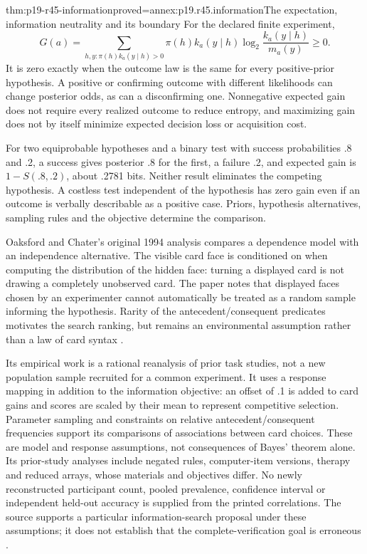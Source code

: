 \begin{hbtheorem}{thm:p19-r45-information}{proved=annex:p19.r45.information}{The expectation, information neutrality and its boundary}
For the declared finite experiment,
\[
 G(a)=\sum_{h,y:\pi(h)k_a(y\mid h)>0}
 \pi(h)k_a(y\mid h)\log_2
 \frac{k_a(y\mid h)}{m_a(y)}\geq0.
\]
It is zero exactly when the outcome law is the same for every
positive-prior hypothesis. A positive or confirming outcome with
different likelihoods can change posterior odds, as can a disconfirming
one. Nonnegative expected gain does not require every realized outcome
to reduce entropy, and maximizing gain does not by itself minimize
expected decision loss or acquisition cost.
\end{hbtheorem}

For two equiprobable hypotheses and a binary test with success
probabilities .8 and .2, a success gives posterior .8 for the first,
a failure .2, and expected gain is \(1-S(.8,.2)\), about .2781 bits.
Neither result eliminates the competing hypothesis. A costless test
independent of the hypothesis has zero gain even if an outcome is
verbally describable as a positive case. Priors, hypothesis alternatives,
sampling rules and the objective determine the comparison.

Oaksford and Chater's original 1994 analysis compares a dependence
model with an independence alternative. The visible card face is
conditioned on when computing the distribution of the hidden face:
turning a displayed card is not drawing a completely unobserved card.
The paper notes that displayed faces chosen by an experimenter cannot
automatically be treated as a random sample informing the hypothesis.
Rarity of the antecedent/consequent predicates motivates the search
ranking, but remains an environmental assumption rather than a law
of card syntax \cite[pp.~608--612]{OaksfordChater1994Selection}.

Its empirical work is a rational reanalysis of prior task studies,
not a new population sample recruited for a common experiment. It
uses a response mapping in addition to the information objective:
an offset of .1 is added to card gains and scores are scaled by
their mean to represent competitive selection. Parameter sampling
and constraints on relative antecedent/consequent frequencies support
its comparisons of associations between card choices. These are model
and response assumptions, not consequences of Bayes' theorem alone.
Its prior-study analyses include negated rules, computer-item versions,
therapy and reduced arrays, whose materials and objectives differ.
No newly reconstructed participant count, pooled prevalence, confidence
interval or independent held-out accuracy is supplied from the printed
correlations. The source supports a particular information-search
proposal under these assumptions; it does not establish that the
complete-verification goal is erroneous
\cite[pp.~614,620--621]{OaksfordChater1994Selection}.

